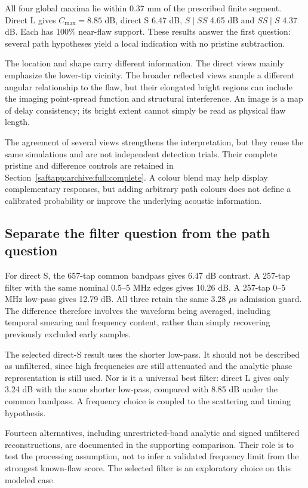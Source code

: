 All four global maxima lie within 0.37 mm of the prescribed finite segment. Direct L gives $C_{\max}=8.85$ dB, direct S 6.47 dB, $S\mid SS$ 4.65 dB and $SS\mid S$ 4.37 dB. Each has 100\% near-flaw support. These results answer the first question: several path hypotheses yield a local indication with no pristine subtraction.

The location and shape carry different information. The direct views mainly emphasize the lower-tip vicinity. The broader reflected views sample a different angular relationship to the flaw, but their elongated bright regions can include the imaging point-spread function and structural interference. An image is a map of delay consistency; its bright extent cannot simply be read as physical flaw length.

The agreement of several views strengthens the interpretation, but they reuse the same simulations and are not independent detection trials. Their complete pristine and difference controls are retained in Section~\ref{saftapp:archive:full:complete}. A colour blend may help display complementary responses, but adding arbitrary path colours does not define a calibrated probability or improve the underlying acoustic information.

\subsection{Separate the filter question from the path question}
For direct S, the 657-tap common bandpass gives 6.47 dB contrast. A 257-tap filter with the same nominal 0.5--5 MHz edges gives 10.26 dB. A 257-tap 0--5 MHz low-pass gives 12.79 dB. All three retain the same 3.28 $\mu$s admission guard. The difference therefore involves the waveform being averaged, including temporal smearing and frequency content, rather than simply recovering previously excluded early samples.

The selected direct-S result uses the shorter low-pass. It should not be described as unfiltered, since high frequencies are still attenuated and the analytic phase representation is still used. Nor is it a universal best filter: direct L gives only 3.24 dB with the same shorter low-pass, compared with 8.85 dB under the common bandpass. A frequency choice is coupled to the scattering and timing hypothesis.

Fourteen alternatives, including unrestricted-band analytic and signed unfiltered reconstructions, are documented in the supporting comparison. Their role is to test the processing assumption, not to infer a validated frequency limit from the strongest known-flaw score. The selected filter is an exploratory choice on this modeled case.

